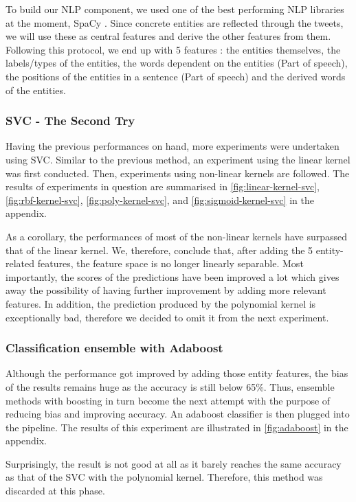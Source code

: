 To build our NLP component, we used one of the best performing NLP libraries at the moment, SpaCy \cite{x2,x3}. Since concrete entities are reflected through the tweets, we will use these as central features and derive the other features from them. Following this protocol, we end up with 5 features : the entities themselves,  the labels/types of the entities, the words dependent on the entities (Part of speech), the positions of the entities in a sentence (Part of speech) and the derived words of the entities.

\subsubsection{SVC - The Second Try}
Having the previous performances on hand, more experiments were undertaken using SVC.
Similar to the previous method, an experiment using the linear kernel was first conducted.
Then, experiments using non-linear kernels are followed.
The results of experiments in question are summarised in \autoref{fig:linear-kernel-svc}, \autoref{fig:rbf-kernel-svc},
\autoref{fig:poly-kernel-svc}, and \autoref{fig:sigmoid-kernel-svc} in the appendix.


As a corollary, the performances of most of the non-linear kernels have surpassed that of the linear kernel.
We, therefore, conclude that, after adding the 5 entity-related features, the feature space is no longer linearly separable.
Most importantly, the scores of the predictions have been improved a lot which gives away the possibility of having further improvement by adding more relevant features.
In addition, the prediction produced by the polynomial kernel is exceptionally bad, therefore we decided to omit it from the next experiment.

\subsubsection{Classification ensemble with Adaboost}

Although the performance got improved by adding those entity features, the bias of the results remains huge as the accuracy is still below 65\%.
Thus, ensemble methods with boosting \cite{x4} in turn become the next attempt with the purpose of reducing bias and improving accuracy.
An adaboost classifier is then plugged into the pipeline.
The results of this experiment are illustrated in \autoref{fig:adaboost} in the appendix.

Surprisingly, the result is not good at all as it barely reaches the same accuracy as that of the SVC with the polynomial kernel.
Therefore, this method was discarded at this phase.

